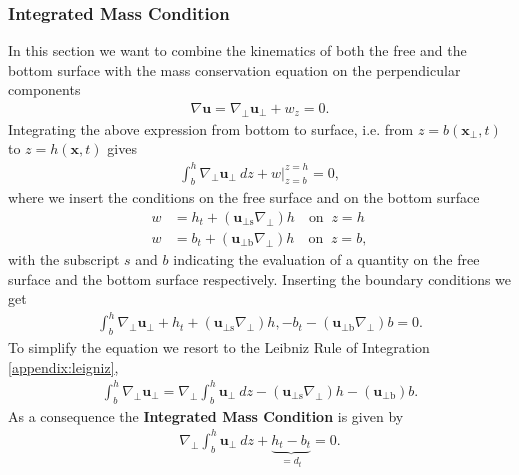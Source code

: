 \subsubsection{Integrated Mass Condition}
In this section we want to combine the kinematics of both the free and the
bottom surface with the mass conservation equation on the perpendicular
components
\begin{align}
    \nabla \mathbf{u} = \nabla_\perp \mathbf{u}_\perp + w_z = 0 .
\end{align}
Integrating the above expression from bottom to surface, i.e. from
$z=b(\mathbf{x}_\perp,t)$ to $z = h (\mathbf{x},t)$ gives
\begin{align}
    \int_b^h \nabla_\perp \mathbf{u}_\perp\ dz + w\bigg|_{z=b}^{z=h} = 0,
\end{align}
where we insert the conditions on the free surface and on the bottom surface
\begin{align}
    w &= h_t + (\mathbf{u}_{\perp \text{s}} \nabla_\perp) h \quad
    \text{on}\;\; z = h\\
    w &= b_t + (\mathbf{u}_{\perp \text{b}} \nabla_\perp) h \quad
    \text{on}\;\; z =b,
\end{align}
with the subscript $s$ and $b$ indicating the evaluation of a quantity
on the free surface and the bottom surface respectively. Inserting the
boundary conditions we get
\begin{align}
    \int_b^h \nabla_\perp \mathbf{u}_\perp
    + h_t + (\mathbf{u}_{\perp \text{s}} \nabla_\perp) h,
    - b_t - (\mathbf{u}_{\perp \text{b}} \nabla_\perp) b= 0.
\end{align}
To simplify the equation we resort to the Leibniz Rule of Integration
\ref{appendix:leigniz},
\begin{align}
     \int_b^h \nabla_\perp\mathbf{u}_\perp =
    \nabla_\perp \int_b^h \mathbf{u}_\perp\ dz - (\mathbf{u}_{\perp \text{s}}
    \nabla_\perp)h - (\mathbf{u}_{\perp \text{b}})b.
\end{align}
As a consequence the \textbf{Integrated Mass Condition} is given by
\begin{align}
    \nabla_\perp \int_b^h \mathbf{u}_\perp\ dz  + \underbrace{h_t -
    b_t}_{=d_t} = 0.
\end{align}
